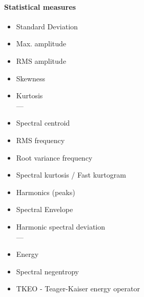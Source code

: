 \paragraph{Statistical measures}
\begin{itemize}
\item Standard Deviation
\item Max. amplitude
\item RMS amplitude
\item Skewness
\item Kurtosis \\
---
\item Spectral centroid
\item RMS frequency
\item Root variance frequency
\item Spectral kurtosis / Fast kurtogram
\item Harmonics (peaks)
	\cite{hatem_comparative_2018}
	\cite{bishop_multi-scale_2018}
	\cite{adikaram_non-parametric_2016}
	\cite{gerber_identification_2013}
	\cite{nunes_evaluation_2007}
	\cite{karlof_statistical_2005}
\item Spectral Envelope
\item Harmonic spectral deviation \\
---
\item Energy
\item Spectral negentropy
	\cite{avoci_spectral_2020}
\item TKEO - Teager-Kaiser energy operator
	\cite{shi_application_2022}
\end{itemize}

